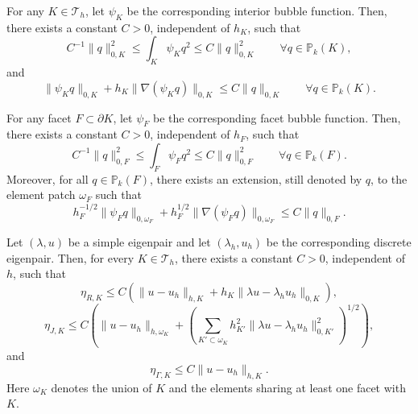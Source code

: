 \documentclass[onefignum,onetabnum,final]{siamart250211}
\numberwithin{equation}{section}
\newcommand\0{\boldsymbol{0}}
\begin{document}
\begin{lemma}
\label{burbujainterior}
For any $K\in\mathcal T_h$, let $\psi_K$ be the corresponding interior bubble function. Then, there exists a constant $C>0$, independent of $h_K$, such that
\[
   C^{-1}\|q\|_{0,K}^2 \le \int_K \psi_K q^2 \le C\|q\|_{0,K}^2\qquad\forall q\in\mathbb P_k(K),
\]
and
\[
   \|\psi_K q\|_{0,K} + h_K\|\nabla(\psi_K q)\|_{0,K}\le C\|q\|_{0,K} \qquad \forall q\in\mathbb P_k(K).
\]
\end{lemma}
\begin{lemma}
\label{burbuja}
For any facet $F\subset\partial K$, let $\psi_F$ be the corresponding facet bubble function. Then, there exists a constant $C>0$, independent of $h_F$, such that
\[
   C^{-1}\|q\|_{0,F}^2 \le \int_F \psi_F q^2 \le C\|q\|_{0,F}^2 \qquad \forall q\in\mathbb P_k(F).
\]
Moreover, for all $q\in\mathbb P_k(F)$, there exists an extension, still denoted by $q$, to the element patch $\omega_F$ such that
\[
   h_F^{-1/2}\|\psi_F q\|_{0,\omega_F} + h_F^{1/2}\|\nabla(\psi_F q)\|_{0,\omega_F} \le C\|q\|_{0,F}.
\]
\end{lemma}
\begin{theorem}
Let $(\lambda,u)$ be a simple eigenpair and let $(\lambda_h,u_h)$ be the corresponding discrete eigenpair. Then, for every $K\in\mathcal T_h$, there exists a constant $C>0$, independent of $h$, such that
\[
   \eta_{R,K} \le C\left(\|u-u_h\|_{h,K} + h_K\|\lambda u-\lambda_hu_h\|_{0,K} \right),
\]
\[
   \eta_{J,K} \le C\left(\|u-u_h\|_{h,\omega_K} + \left(\sum_{K'\subset\omega_K}h_{K'}^2\|\lambda u-\lambda_hu_h\|_{0,K'}^2\right)^{1/2}\right),
\]
and
\[
   \eta_{\Gamma,K} \le C\|u-u_h\|_{h,K}.
\]
Here $\omega_K$ denotes the union of $K$ and the elements sharing at least one facet with $K$.
\end{theorem}
\end{document}
